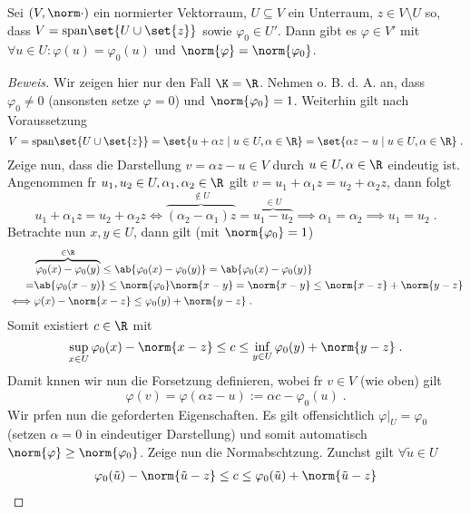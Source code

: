 	\begin{lemma}
		Sei \((V,\norm\cdot)\) ein normierter Vektorraum, \(U\subseteq V\) ein Unterraum, \(z \in V\setminus U\) so, dass \(V = \text{span}\set{U \cup \set{z}}\) sowie \(\varphi_0 \in U'\). Dann gibt es \(\varphi \in V'\) mit \(\forall u \in U: \varphi(u) = \varphi_0(u)\) und \(\norm{\varphi} = \norm{\varphi_0}\).
	
		\label{Lemma_Hahn_Banach}
	\end{lemma}
	\begin{proof}[Beweis]
		Wir zeigen hier nur den Fall \(\K = \R\). Nehmen o. B. d. A. an, dass \(\varphi_0 \neq 0\) (ansonsten setze \(\varphi = 0\)) und \(\norm{\varphi_0} = 1\). Weiterhin gilt nach Voraussetzung
		\[V = \text{span}\set{U\cup\set{z}} = \set{u + \alpha z \;\vert\; u \in U, \alpha \in \R} = \set{\alpha z - u \;\vert\; u \in U, \alpha\in \R}\;.\]
		Zeige nun, dass die Darstellung \(v = \alpha z - u \in V\) durch \(u\in U, \alpha \in \R\) eindeutig ist. Angenommen f\us r \(u_1, u_2 \in U, \alpha_1, \alpha_2 \in \R\) gilt \(v = u_1 + \alpha_1 z = u_2 + \alpha_2 z\), dann folgt
		\[u_1 + \alpha_1 z = u_2 + \alpha_2 z \iff \overbrace{(\alpha_2 - \alpha_1)z}^{\not\in U} = \overbrace{u_1 - u_2}^{\in U}\implies \alpha_1 = \alpha_2 \implies u_1 = u_2\;.\]
		Betrachte nun \(x,y \in U\), dann gilt (mit \(\norm{\varphi_0} = 1\))
		\begin{align*}&\overbrace{\varphi_0(x) -\varphi_0(y)}^{\in \R} \leq \ab{\varphi_0(x) -\varphi_0(y)} = \ab{\varphi_0(x) -\varphi_0(y)} \\= &\ab{\varphi_0(x-y)} \leq \norm{\varphi_0} \norm{x-y}  
			= \norm{x-y} \leq \norm{x-z} + \norm{y-z} \\ \iff &\varphi(x) - \norm{x-z} \leq \varphi_0(y) + \norm{y-z}\;.
			\end{align*}
			Somit existiert \(c\in \R\) mit 
			\[\sup_{x\in U}\varphi_0(x) - \norm{x-z}\leq c \leq \inf_{y\in U} \varphi_0(y) + \norm{y-z}\;.\]
			Damit k\os nnen wir nun die Forsetzung definieren, wobei f\us r \(v \in V\) (wie oben) gilt
			\[\varphi(v) = \varphi(\alpha z - u) := \alpha c - \varphi_0(u)\;.\]
			Wir pr\us fen nun die geforderten Eigenschaften. Es gilt offensichtlich \(\varphi\vert_U = \varphi_0\) (setzen \(\alpha = 0\) in eindeutiger Darstellung) und somit automatisch 
			\(\norm{\varphi} \geq \norm{\varphi_0}\). Zeige nun die Normabsch\as tzung. Zun\as chst gilt  \(\forall\tilde u \in U\)
			\begin{align*}
			& \varphi_0(\tilde u) - \norm{\tilde u - z} \leq c \leq \varphi_0 (\tilde u) + \norm{\tilde u -z} \\

\end{align*}
\end{proof}
